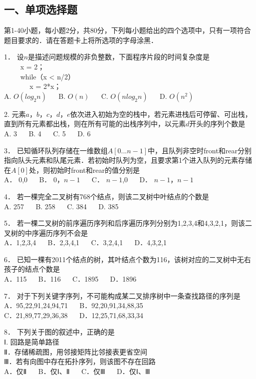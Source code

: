 
\subsection{一、单项选择题}
第1-40小题，每小题2分，共80分，下列每小题给出的四个选项中，只有一项符合题目要求的．请在答题卡上将所选项的字母涂黑．

1． 设$n$是描述问题规模的非负整数，下面程序片段的时间复杂度是  \\
$\qquad$ x = 2； \\
$\qquad$ while（x < n/2） \\
$\qquad$ $\quad$ x = 2*x； \\
A. $O(log_2n)$ $\quad$ B. $O(n)$ $\quad$ C. $O(nlog_2n)$ $\quad$ D. $O(n^2)$

2. 元素$a$，$b$，$c$，$d$，$e$依次进入初始为空的栈中，若元素进栈后可停留、可出栈，直到所有元素都出栈，则在所有可能的出栈序列中，以元素$d$开头的序列个数是  \\
A. 3  $\quad$  B. 4  $\quad$  C. 5  $\quad$  D. 6

3． 已知循环队列存储在一维数组$A[0...n-1]$中，且队列非空时front和rear分别指向队头元素和队尾元素．若初始时队列为空，且要求第1个进入队列的元素存储在$A[0]$处，则初始时front和rear的值分别是 \\
A． $0$,$0$  $\quad$ B． $0$，$n-1$ $\quad$ C． $n-1$,$0$ $\quad$ D． $n-1$，$n-1$ 

4． 若一棵完全二叉树有768个结点，则该二叉树中叶结点的个数是 \\
A. 257 $\quad$ B. 258 $\quad$ C. 384 $\quad$ D. 385

5． 若一棵二叉树的前序遍历序列和后序遍历序列分别为1,2,3,4和4,3,2,1，则该二叉树的中序遍历序列不会是 \\
A．1,2,3,4 $\quad$ B．2,3,4,1 $\quad$ C．3,2,4,1 $\quad$ D．4,3,2,1

6． 已知一棵有2011个结点的树，其叶结点个数为116，该树对应的二叉树中无右孩子的结点个数是 \\
A．115 $\quad$ B．116 $\quad$ C．1895 $\quad$ D．1896

7． 对于下列关键字序列，不可能构成某二叉排序树中一条查找路径的序列是 \\
A．95,22,91,24,94,71 $\quad$ B．92,20,91,34,88,35 \\
C．21,89,77,29,36,38 $\quad$ D．12,25,71,68,33,34

8． 下列关于图的叙述中，正确的是 \\
Ⅰ. 回路是简单路径 \\
Ⅱ．存储稀疏图，用邻接矩阵比邻接表更省空间 \\
Ⅲ．若有向图中存在拓扑序列，则该图不存在回路 \\
A．仅Ⅱ $\quad$ B．仅Ⅰ、Ⅱ $\quad$  C．仅Ⅲ $\quad$ D．仅Ⅰ、Ⅲ

